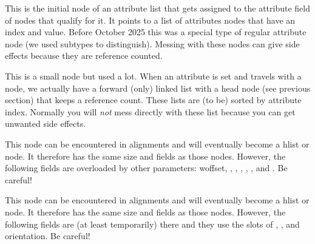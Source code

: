 This is the initial node of an attribute list that gets assigned to the attribute
field of nodes that qualify for it. It points to a list of attributes nodes that
have an index and value. Before October 2025 this was a special type of regular
attribute node (we used subtypes to distinguish). Messing with these nodes can
give side effects because they are reference counted.



\stopsubsection

\startsubsection[title={attribute}]

This is a small node but used a lot. When an attribute is set and travels with a
node, we actually have a forward (only) linked list with a head node (see
previous section) that keeps a reference count. These lists are (to be) sorted by
attribute index. Normally you will {\em not} mess directly with these list
because you can get unwanted side effects.



\stopsubsection

\startsubsection[title={alignrecord}]

This node can be encountered in alignments and will eventually become a \type
{hlist} or  node. It therefore has the same size and fields as those
nodes. However, the following fields are overloaded by other parameters: \type
{woffset}, , , , ,
,  and . Be careful!



\stopsubsection

\startsubsection[title={unset}]

This node can be encountered in alignments and will eventually become a \type
{hlist} or  node. It therefore has the same size and fields as those
nodes. However, the following fields are (at least temporarily) there and they
use the slots of , ,  and \type
{orientation}. Be careful!



